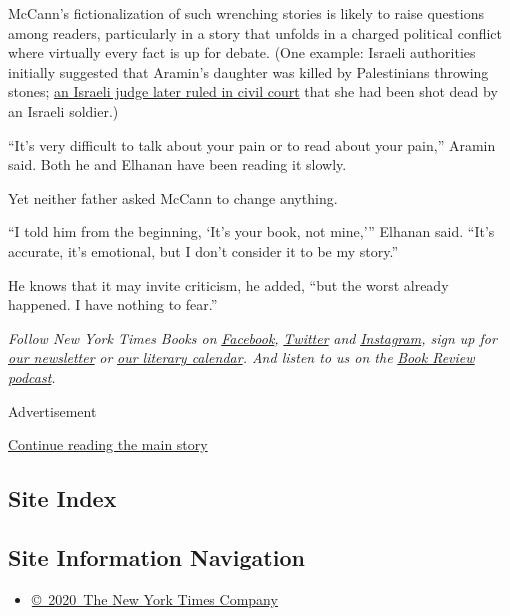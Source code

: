 McCann's fictionalization of such wrenching stories is likely to raise
questions among readers, particularly in a story that unfolds in a
charged political conflict where virtually every fact is up for debate.
(One example: Israeli authorities initially suggested that Aramin's
daughter was killed by Palestinians throwing stones;
\href{https://www.theguardian.com/world/2011/sep/26/israel-pay-family-compensation-palestinian-girl}{an
Israeli judge later ruled in civil court} that she had been shot dead by
an Israeli soldier.)

``It's very difficult to talk about your pain or to read about your
pain,'' Aramin said. Both he and Elhanan have been reading it slowly.

Yet neither father asked McCann to change anything.

``I told him from the beginning, `It's your book, not mine,''' Elhanan
said. ``It's accurate, it's emotional, but I don't consider it to be my
story.''

He knows that it may invite criticism, he added, ``but the worst already
happened. I have nothing to fear.''

\emph{Follow New York Times Books on}
\href{https://www.facebook.com/nytbooks/}{\emph{Facebook}}\emph{,}
\href{https://twitter.com/nytimesbooks}{\emph{Twitter}} \emph{and}
\href{https://www.instagram.com/nytbooks/}{\emph{Instagram}}\emph{, sign
up for}
\href{https://www.nytimes.com/newsletters/books-review}{\emph{our
newsletter}} \emph{or}
\href{https://www.nytimes.com/interactive/2017/books/books-calendar.html}{\emph{our
literary calendar}}\emph{. And listen to us on the}
\href{https://www.nytimes.com/column/book-review-podcast}{\emph{Book
Review podcast}}\emph{.}

Advertisement

\protect\hyperlink{after-bottom}{Continue reading the main story}

\hypertarget{site-index}{%
\subsection{Site Index}\label{site-index}}

\hypertarget{site-information-navigation}{%
\subsection{Site Information
Navigation}\label{site-information-navigation}}

\begin{itemize}
\tightlist
\item
  \href{https://help.nytimes.com/hc/en-us/articles/115014792127-Copyright-notice}{©~2020~The
  New York Times Company}
\end{itemize}

